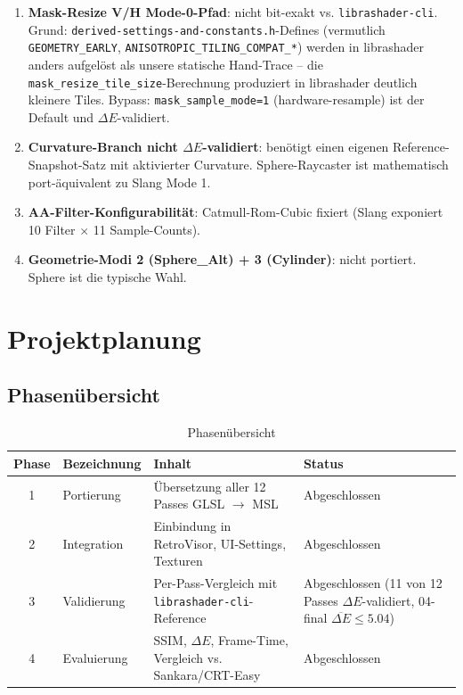 \documentclass[11pt, a4paper]{article}
\newcommand{\tableheadercolor}{\rowcolor{hkared}}
\newcommand{\thw}[1]{\color{white}\textbf{#1}}  %
\begin{document}
\begin{enumerate}[leftmargin=*]
    \item \textbf{Mask-Resize V/H Mode-0-Pfad}: nicht bit-exakt vs. \texttt{librashader-cli}. Grund: \texttt{derived-settings-and-constants.h}-Defines (vermutlich \texttt{GEOMETRY\_EARLY}, \texttt{ANISOTROPIC\_TILING\_COMPAT\_*}) werden in librashader anders aufgel\"ost als unsere statische Hand-Trace -- die \texttt{mask\_resize\_tile\_size}-Berechnung produziert in librashader deutlich kleinere Tiles. Bypass: \texttt{mask\_sample\_mode=1} (hardware-resample) ist der Default und $\Delta E$-validiert.
    \item \textbf{Curvature-Branch nicht $\Delta E$-validiert}: ben\"otigt einen eigenen Reference-Snapshot-Satz mit aktivierter Curvature. Sphere-Raycaster ist mathematisch port-\"aquivalent zu Slang Mode 1.
    \item \textbf{AA-Filter-Konfigurabilit\"at}: Catmull-Rom-Cubic fixiert (Slang exponiert 10 Filter $\times$ 11 Sample-Counts).
    \item \textbf{Geometrie-Modi 2 (Sphere\_Alt) + 3 (Cylinder)}: nicht portiert. Sphere ist die typische Wahl.
\end{enumerate}
\section{Projektplanung}
\vspace{.125cm}

\subsection{Phasen\"ubersicht}

\begin{table}[H]
\centering
\small
{}
\begin{tabular}{clll}
    \toprule
    \tableheadercolor \thw{Phase} & \thw{Bezeichnung} & \thw{Inhalt} & \thw{Status} \\
    \midrule
    1 & Portierung & \"Ubersetzung aller 12 Passes GLSL $\rightarrow$ MSL & Abgeschlossen \\
    2 & Integration & Einbindung in RetroVisor, UI-Settings, Texturen & Abgeschlossen \\
    3 & Validierung & Per-Pass-Vergleich mit \texttt{librashader-cli}-Reference & Abgeschlossen (11 von 12 Passes $\Delta E$-validiert, 04-final $\overline{\Delta E} \leq 5.04$) \\
    4 & Evaluierung & SSIM, $\Delta E$, Frame-Time, Vergleich vs. Sankara/CRT-Easy & Abgeschlossen \\
    \bottomrule
\end{tabular}
 \vspace{.125cm}
\caption{Phasen\"ubersicht}
\end{table}
\end{document}
